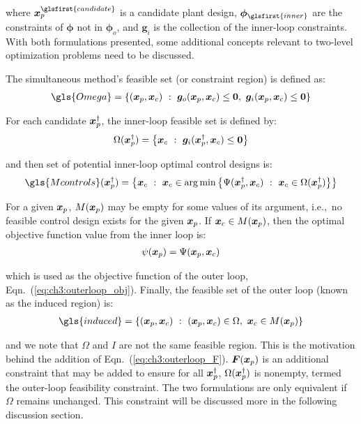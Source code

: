 \noindent where $\bxp^{\glsfirst{candidate}}$ is a candidate plant design, $\bm{\phi}_{\glsfirst{inner}}$ are the constraints of $\bm{\phi}$ not in $\bm{\phi}_{o}$, and $\bm{g}_{i}$ is the collection of the inner-loop constraints. With both formulations presented, some additional concepts relevant to two-level optimization problems need to be discussed.

The simultaneous method's feasible set (or constraint region) is defined as:
\begin{align}
\gls{Omega} = \left\lbrace (\bxp, \bxc)\ :\ \bm{g}_{o}(\bxp, \bxc) \leq \bm{0}, \ \bm{g}_{i}(\bxp, \bxc) \leq \bm{0} \right\rbrace
\end{align}

\noindent For each candidate $\bm{x}_p^{\dagger}$, the inner-loop feasible set is defined by:
\begin{align}
\Omega(\bxp^{\dagger}) = \left\lbrace \bxc\ : \ \bm{g}_{i}(\bxp^{\dagger}, \bxc) \leq \bm{0} \right\rbrace
\end{align}

\noindent and then set of potential inner-loop optimal control designs is:
\begin{align}
\gls{Mcontrols}(\bxp^{\dagger}) = \left\lbrace \bxc\ :\ \bxc \in \arg\min \left\lbrace \Psi(\bxp^{\dagger}, \bxc)\ :\ \bxc \in \Omega(\bxp^{\dagger})  \right\rbrace \right\rbrace
\end{align}

\noindent For a given $\bm{x}_p$, $M(\bm{x}_p)$ may be empty for some values of its argument, i.e.,~no feasible control design exists for the given $\bm{x}_p$. If $\bm{x}_c \in M(\bm{x}_p)$, then the optimal objective function value from the inner loop is:
\begin{align}
\psi(\bm{x}_p) = \Psi(\bm{x}_p, \bm{x}_c)
\end{align}

\noindent which is used as the objective function of the outer loop, Eqn.~(\ref{eq:ch3:outerloop_obj}). Finally, the feasible set of the outer loop (known as the induced region) is:
\begin{align}
\gls{induced} = \left\lbrace (\bxp, \bxc)\ :\ (\bxp, \bxc) \in \Omega,\ \bxc \in M(\bxp) \right\rbrace
\end{align}

\noindent and we note that $\Omega$ and $I$ are not the same feasible region. This is the motivation behind the addition of Eqn.~(\ref{eq:ch3:outerloop_F}). $\bm{F}(\bm{x}_p)$ is an additional constraint that may be added to ensure for all $\bm{x}_p^{\dagger}$, $\Omega(\bm{x}_p^{\dagger})$ is nonempty, termed the outer-loop feasibility constraint. The two formulations are only equivalent if $\Omega$ remains unchanged. This constraint will be discussed more in the following discussion section.

